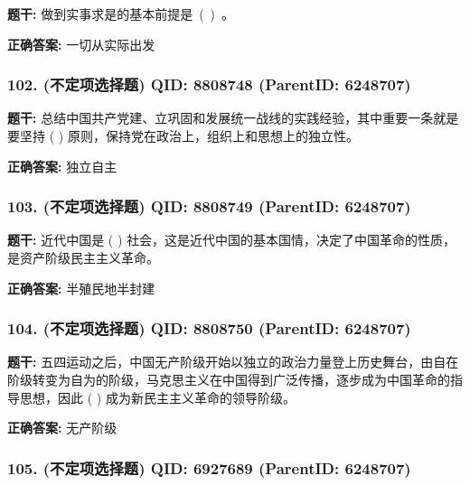 \documentclass[12pt,UTF8]{ctexart}
\begin{document}
\textbf{题干:}
做到实事求是的基本前提是 ( ) 。



\textbf{正确答案:}
一切从实际出发

\vspace{0.3em}\hrulefill\vspace{0.7em}

\subsubsection*{102. (不定项选择题) \small QID: 8808748 (ParentID: 6248707)}

\textbf{题干:}
总结中国共产党建、立巩固和发展统一战线的实践经验，其中重要一条就是要坚持 ( ) 原则，保持党在政治上，组织上和思想上的独立性。



\textbf{正确答案:}
独立自主

\vspace{0.3em}\hrulefill\vspace{0.7em}

\subsubsection*{103. (不定项选择题) \small QID: 8808749 (ParentID: 6248707)}

\textbf{题干:}
近代中国是 ( ) 社会，这是近代中国的基本国情，决定了中国革命的性质，是资产阶级民主主义革命。



\textbf{正确答案:}
半殖民地半封建

\vspace{0.3em}\hrulefill\vspace{0.7em}

\subsubsection*{104. (不定项选择题) \small QID: 8808750 (ParentID: 6248707)}

\textbf{题干:}
五四运动之后，中国无产阶级开始以独立的政治力量登上历史舞台，由自在阶级转变为自为的阶级，马克思主义在中国得到广泛传播，逐步成为中国革命的指导思想，因此 ( ) 成为新民主主义革命的领导阶级。



\textbf{正确答案:}
无产阶级

\vspace{0.3em}\hrulefill\vspace{0.7em}

\subsubsection*{105. (不定项选择题) \small QID: 6927689 (ParentID: 6248707)}
\end{document}
